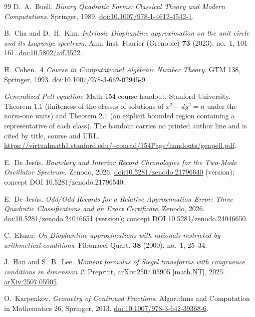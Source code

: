 \documentclass[11pt]{article}
\theoremstyle{definition}
\theoremstyle{remark}
\begin{document}
\begin{thebibliography}{99}
 D.~A.~Buell. \emph{Binary Quadratic Forms: Classical Theory and Modern
Computations}. Springer, 1989. \href{https://doi.org/10.1007/978-1-4612-4542-1}
{doi:10.1007/978-1-4612-4542-1}.

 B.~Cha and D.~H.~Kim. \emph{Intrinsic Diophantine approximation on the unit
circle and its Lagrange spectrum}. Ann. Inst. Fourier (Grenoble) \textbf{73} (2023), no.~1,
101--161. \href{https://doi.org/10.5802/aif.3522}{doi:10.5802/aif.3522}.

 H.~Cohen. \emph{A Course in Computational Algebraic Number Theory}. GTM
138, Springer, 1993. \href{https://doi.org/10.1007/978-3-662-02945-9}
{doi:10.1007/978-3-662-02945-9}.

 \emph{Generalized Pell equation}. Math 154 course handout, Stanford
University. Theorem 1.1 (finiteness of the classes of solutions of $x^2-dy^2=n$ under the
norm-one units) and Theorem 2.1 (an explicit bounded region containing a representative of each
class). The handout carries no printed author line and is cited by title, course and URL.
\url{https://virtualmath1.stanford.edu/~conrad/154Page/handouts/genpell.pdf}.

 E.~De Jes\'us. \emph{Boundary and Interior Record Chronologies for
the Two-Mode Oscillator Spectrum}. Zenodo, 2026. \href{https://doi.org/10.5281/zenodo.21796640}
{doi:10.5281/zenodo.21796640} (version); concept DOI 10.5281/zenodo.21796540.

 E.~De Jes\'us. \emph{Odd/Odd Records for a Relative Approximation
Error: Three Quadratic Classifications and an Exact Certificate}. Zenodo, 2026.
\href{https://doi.org/10.5281/zenodo.24046651}{doi:10.5281/zenodo.24046651} (version); concept
DOI 10.5281/zenodo.24046650.

 C.~Elsner. \emph{On Diophantine approximations with rationals restricted by
arithmetical conditions}. Fibonacci Quart. \textbf{38} (2000), no.~1, 25--34.

 J.~Han and S.~B.~Lee. \emph{Moment formulas of Siegel transforms with
congruence conditions in dimension 2}. Preprint, arXiv:2507.05905 [math.NT], 2025.
\href{https://arxiv.org/abs/2507.05905}{arXiv:2507.05905}.

 O.~Karpenkov. \emph{Geometry of Continued Fractions}. Algorithms and
Computation in Mathematics 26, Springer, 2013.
\href{https://doi.org/10.1007/978-3-642-39368-6}{doi:10.1007/978-3-642-39368-6}.


\end{thebibliography}
\end{document}
